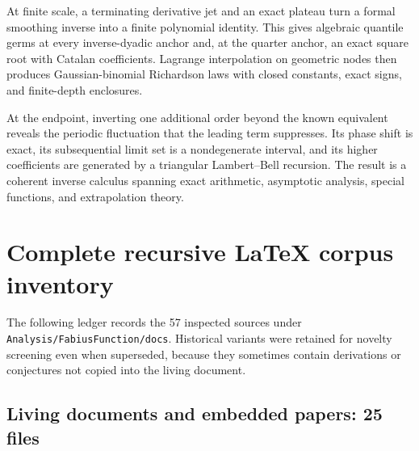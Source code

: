 \documentclass[11pt,oneside]{article}
\numberwithin{equation}{section}
\theoremstyle{definition}
\theoremstyle{remark}
\begin{document}
At finite scale, a terminating derivative jet and an exact plateau turn a formal smoothing
inverse into a finite polynomial identity.  This gives algebraic quantile germs at every
inverse-dyadic anchor and, at the quarter anchor, an exact square root with Catalan
coefficients.  Lagrange interpolation on geometric nodes then produces Gaussian-binomial
Richardson laws with closed constants, exact signs, and finite-depth enclosures.

At the endpoint, inverting one additional order beyond the known equivalent reveals the
periodic fluctuation that the leading term suppresses.  Its phase shift is exact, its
subsequential limit set is a nondegenerate interval, and its higher coefficients are generated
by a triangular Lambert--Bell recursion.  The result is a coherent inverse calculus spanning
exact arithmetic, asymptotic analysis, special functions, and extrapolation theory.

\appendix

\section{Complete recursive LaTeX corpus inventory}
\label{app:inventory}

The following ledger records the 57 inspected sources under
\texttt{Analysis/FabiusFunction/docs}.  Historical variants were retained for novelty
screening even when superseded, because they sometimes contain derivations or conjectures not
copied into the living document.

\subsection{Living documents and embedded papers: 25 files}
\end{document}
